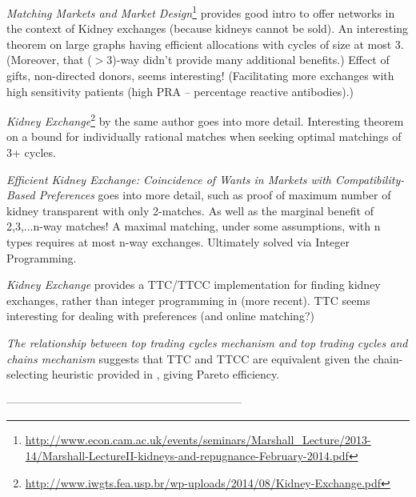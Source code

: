 \documentclass[
11pt, %
a4paper, %
oneside, %
headinclude,footinclude, %
BCOR5mm, %
]{scrartcl}
\begin{document}
\textit{Matching Markets and Market Design}\footnote{\url{http://www.econ.cam.ac.uk/events/seminars/Marshall_Lecture/2013-14/Marshall-LectureII-kidneys-and-repugnance-February-2014.pdf}} provides good intro to offer networks in the context of Kidney exchanges (because kidneys cannot be sold). An interesting theorem on large graphs having efficient allocations with cycles of size at most 3. (Moreover, that ($>3$)-way didn't provide many additional benefits.) Effect of gifts, non-directed donors, seems interesting! (Facilitating more exchanges with high sensitivity patients (high PRA -- percentage reactive antibodies).)

\textit{Kidney Exchange}\footnote{\url{http://www.iwgts.fea.usp.br/wp-uploads/2014/08/Kidney-Exchange.pdf}} by the same author goes into more detail. Interesting theorem on a bound for individually rational matches when seeking optimal matchings of 3+ cycles.

\textit{Efficient Kidney Exchange: Coincidence of Wants in Markets with Compatibility-Based Preferences} \cite{Rot2} goes into more detail, such as proof of maximum number of kidney transparent with only 2-matches. As well as the marginal benefit of 2,3,...n-way matches! A maximal matching, under some assumptions, with n types requires at most n-way exchanges. Ultimately solved via Integer Programming.

\textit{Kidney Exchange} \cite{Rot1} provides a TTC/TTCC implementation for finding kidney exchanges, rather than integer programming in \cite{Rot2} (more recent). TTC seems interesting for dealing with preferences (and online matching?)

\textit{The relationship between top trading cycles mechanism and top trading cycles and chains mechanism} \cite{Kri1} suggests that TTC and TTCC are equivalent given the chain-selecting heuristic provided in \cite{Rot1}, giving Pareto efficiency.

---------------------------------------------------------------

\renewcommand{\refname}{\spacedlowsmallcaps{References}} %




\end{document}
